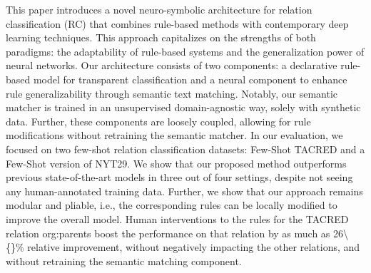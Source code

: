 This paper introduces a novel neuro-symbolic architecture for relation classification (RC) that combines rule-based methods with contemporary deep learning techniques.  This approach capitalizes on the strengths of both paradigms: the adaptability of rule-based systems and the generalization power of neural networks. Our architecture consists of two components: a declarative rule-based model for transparent classification and a neural component to enhance rule generalizability through semantic text matching. Notably, our semantic matcher is trained in an unsupervised domain-agnostic way, solely with synthetic data. Further, these components are loosely coupled, allowing for rule modifications without retraining the semantic matcher. In our evaluation, we focused on two few-shot relation classification datasets: Few-Shot TACRED and a Few-Shot version of NYT29.  We show that our proposed method outperforms previous state-of-the-art models in three out of four settings, despite not seeing any human-annotated training data. Further, we show that our approach remains modular and pliable, i.e., the corresponding rules can be locally modified to improve the overall model. Human interventions to the rules for the TACRED relation org:parents boost the performance on that relation by as much as 26\textbackslash\{\}\% relative improvement, without negatively impacting the other relations, and without retraining the semantic matching component.